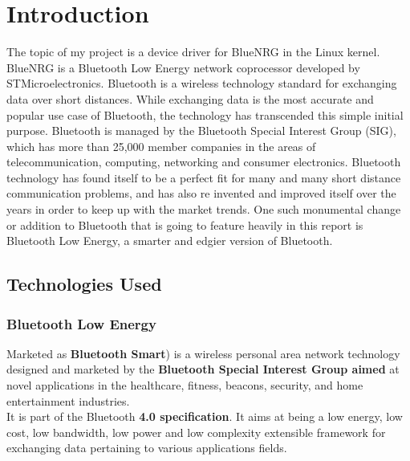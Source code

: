 \chapter{Introduction}
The topic of my project is a device driver for BlueNRG in the Linux kernel.\\
BlueNRG is a Bluetooth Low Energy network coprocessor developed by STMicroelectronics.
Bluetooth is a wireless technology standard for exchanging data over short distances. While exchanging data is the most accurate and popular use case of Bluetooth, the technology has transcended this simple initial purpose. Bluetooth is managed by the Bluetooth Special Interest Group (SIG), which has more than 25,000 member companies in the areas of telecommunication, computing, networking and consumer electronics. Bluetooth technology has found itself to be a perfect fit for many and many short distance communication problems, and has also re invented and improved itself over the years in order to keep up with the market trends. One such monumental change or addition to Bluetooth that is going to feature heavily in this report is Bluetooth Low Energy, a smarter and edgier version of Bluetooth.
\section{Technologies Used}
\subsection{Bluetooth Low Energy} Marketed as \textbf{Bluetooth Smart}) is a wireless personal area network technology designed and marketed by the \textbf{Bluetooth Special Interest Group aimed} at novel applications in the healthcare, fitness, beacons, security, and home entertainment industries. \\
It is part of the Bluetooth \textbf{4.0 specification}. It aims at being a low energy, low cost, low bandwidth, low power and low complexity extensible framework for exchanging data pertaining to various applications fields.
